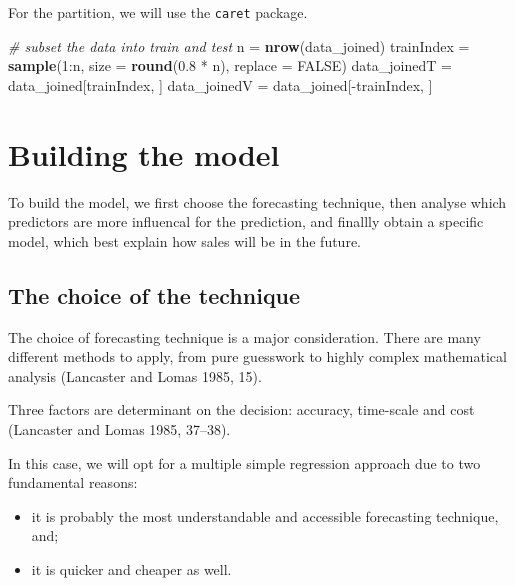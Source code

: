\documentclass[11pt,]{article}
\newenvironment{Shaded}{\begin{snugshade}}{\end{snugshade}}
\newcommand{\KeywordTok}[1]{\textcolor[rgb]{0.13,0.29,0.53}{\textbf{{#1}}}}
\newcommand{\DataTypeTok}[1]{\textcolor[rgb]{0.13,0.29,0.53}{{#1}}}
\newcommand{\DecValTok}[1]{\textcolor[rgb]{0.00,0.00,0.81}{{#1}}}
\newcommand{\FloatTok}[1]{\textcolor[rgb]{0.00,0.00,0.81}{{#1}}}
\newcommand{\StringTok}[1]{\textcolor[rgb]{0.31,0.60,0.02}{{#1}}}
\newcommand{\CommentTok}[1]{\textcolor[rgb]{0.56,0.35,0.01}{\textit{{#1}}}}
\newcommand{\OtherTok}[1]{\textcolor[rgb]{0.56,0.35,0.01}{{#1}}}
\newcommand{\NormalTok}[1]{{#1}}
\begin{document}
For the partition, we will use the \texttt{caret} package.

\begin{Shaded}
\begin{Highlighting}[]
\CommentTok{# subset the data into train and test}
\NormalTok{n =}\StringTok{ }\KeywordTok{nrow}\NormalTok{(data_joined)}
\NormalTok{trainIndex =}\StringTok{ }\KeywordTok{sample}\NormalTok{(}\DecValTok{1}\NormalTok{:n, }\DataTypeTok{size =} \KeywordTok{round}\NormalTok{(}\FloatTok{0.8} \NormalTok{*}\StringTok{ }\NormalTok{n), }\DataTypeTok{replace =} \OtherTok{FALSE}\NormalTok{)}
\NormalTok{data_joinedT =}\StringTok{ }\NormalTok{data_joined[trainIndex, ]}
\NormalTok{data_joinedV =}\StringTok{ }\NormalTok{data_joined[-trainIndex, ]}
\end{Highlighting}
\end{Shaded}

\section{Building the model}\label{building-the-model}

To build the model, we first choose the forecasting technique, then
analyse which predictors are more influencal for the prediction, and
finallly obtain a specific model, which best explain how sales will be
in the future.

\subsection{The choice of the
technique}\label{the-choice-of-the-technique}

The choice of forecasting technique is a major consideration. There are
many different methods to apply, from pure guesswork to highly complex
mathematical analysis (Lancaster and Lomas 1985, 15).

Three factors are determinant on the decision: accuracy, time-scale and
cost (Lancaster and Lomas 1985, 37--38).

In this case, we will opt for a multiple simple regression approach due
to two fundamental reasons:

\begin{itemize}
\item
  it is probably the most understandable and accessible forecasting
  technique, and;
\item
  it is quicker and cheaper as well.
\end{itemize}
\end{document}
